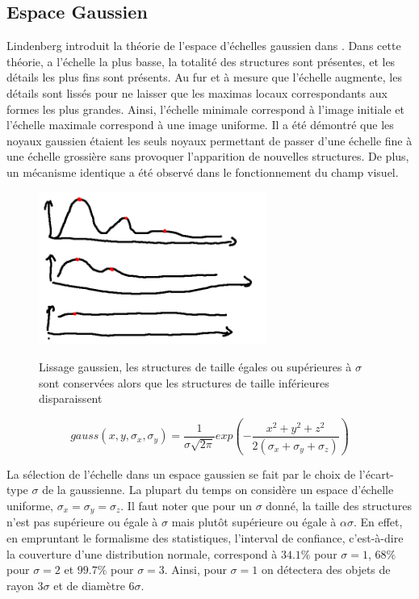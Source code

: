 \subsection{Espace Gaussien}
\label{sec:EA:rehaussement:echelle:gaussien}

Lindenberg introduit la théorie de l'espace d'échelles gaussien dans \cite{lindeberg2013_scale}. Dans cette théorie, a l'échelle la plus basse, la totalité des structures sont présentes, et les détails les plus fins sont présents. Au fur et à mesure que l'échelle augmente, les détails sont lissés pour ne laisser que les maximas locaux correspondants aux formes les plus grandes. Ainsi, l'échelle minimale correspond à l'image initiale et l'échelle maximale correspond à une image uniforme. Il a été démontré que les noyaux gaussien étaient les seuls noyaux permettant de passer d'une échelle fine à une échelle grossière sans provoquer l'apparition de nouvelles structures. De plus, un mécanisme identique a été observé dans le fonctionnement du champ visuel.

\begin{figure}
  \centering
  \includegraphics[height=5cm]{Images/gaussian_smoothing.png}
  \label{fig:gaussian_smoothing}
  \caption{Lissage gaussien, les structures de taille égales ou supérieures à $\sigma$ sont conservées alors que les structures de taille inférieures disparaissent}
\end{figure}

\begin{equation}
  gauss(x,y,\sigma_{x},\sigma_{y}) = \frac{1}{ \sigma\sqrt{2\pi} }exp(-\frac{x^2 + y^2 + z^2}{2(\sigma_{x}+ \sigma_{y}+ \sigma_{z}) })
\end{equation}

La sélection de l'échelle dans un espace gaussien se fait par le choix de l'écart-type $\sigma$ de la gaussienne. La plupart du temps on considère un espace d'échelle uniforme, $\sigma_x = \sigma_y = \sigma_z$. Il faut noter que pour un $\sigma$ donné, la taille des structures n'est pas supérieure ou égale à $\sigma$ mais plutôt supérieure ou égale à $\alpha\sigma$. En effet, en empruntant le formalisme des statistiques, l'interval de confiance, c'est-à-dire la couverture d'une distribution normale, correspond à $34.1\%$ pour $\sigma=1$, $68\%$ pour $\sigma=2$ et $99.7\%$ pour $\sigma=3$. Ainsi, pour $\sigma=1$ on détectera des objets de rayon $3\sigma$ et de diamètre $6\sigma$.  

